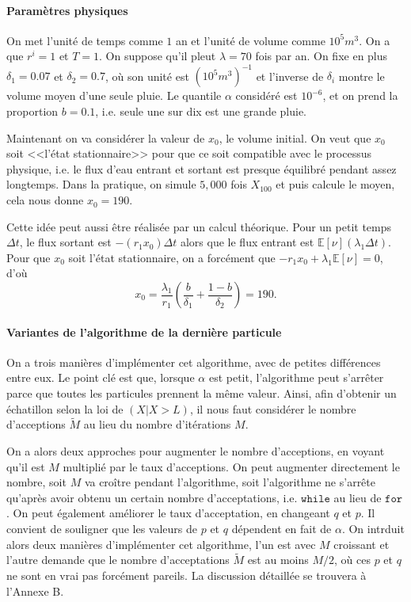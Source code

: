 \documentclass{article}
\begin{document}
\paragraph{Paramètres physiques} On met l'unité de temps comme $1$ an et l'unité de volume comme $10^5m^3$. On a que $r^i=1$ et $T=1$. On suppose qu'il pleut $\lambda=70$ fois par an. On fixe en plus $\delta_1=0.07$ et $\delta_2=0.7$, où son unité est $(10^5m^3)^{-1}$ et l'inverse de $\delta_i$ montre le volume moyen d'une seule pluie. Le quantile $\alpha$ considéré est $10^{-6}$, et on prend la proportion $b=0.1$, i.e. seule une sur dix est une grande pluie.

Maintenant on va considérer la valeur de $x_0$, le volume initial. On veut que $x_0$ soit <<l'état stationnaire>> pour que ce soit compatible avec le processus physique, i.e. le flux d'eau entrant et sortant est presque équilibré pendant assez longtemps. Dans la pratique, on simule $5,000$ fois $X_{100}$ et puis calcule le moyen, cela nous donne $x_0=190$.

Cette idée peut aussi être réalisée par un calcul théorique. Pour un petit temps $\Delta t$, le flux sortant est $-(r_1 x_0)\Delta t$ alors que le flux entrant est $\mathbb E[\nu](\lambda_1\Delta t)$. Pour que $x_0$ soit l'état stationnaire, on a forcément que  $-r_1x_0+\lambda_1{\mathbb E[\nu]}=0$, d'où
\[x_0=\frac{\lambda_1}{r_1}\left(\frac{b}{\delta_1}+\frac{1-b}{\delta_2}\right)=190.\]

\paragraph{Variantes de l'algorithme de la dernière particule} On a trois manières d'implémenter cet algorithme, avec de petites différences entre eux. Le point clé est que, lorsque $\alpha$ est petit, l'algorithme peut s'arrêter parce que toutes les particules prennent la même valeur. Ainsi, afin d'obtenir un échatillon selon la loi de $(X|X>L)$, il nous faut considérer le nombre d'acceptions $\tilde M$ au lieu du nombre d'itérations $M$. 

On a alors deux approches pour augmenter le nombre d'acceptions, en voyant qu'il est $M$ multiplié par le taux d'acceptions. On peut augmenter directement le nombre, soit $M$ va croître pendant l'algorithme, soit l'algorithme ne s'arrête qu'après avoir obtenu un certain nombre d'acceptations, i.e. $\texttt{while}$ au lieu de $\texttt{for}$. On peut également améliorer le taux d'acceptation, en changeant $q$ et $p$. Il convient de souligner que les valeurs de $p$ et $q$ dépendent en fait de $\alpha$. On intrduit alors deux manières d'implémenter cet algorithme, l'un est avec $M$ croissant et l'autre demande que le nombre d'acceptations $\tilde M$ est au moins $M/2$, où ces $p$ et $q$ ne sont en vrai pas forcément pareils. La discussion détaillée se trouvera à l’Annexe B.
\end{document}
